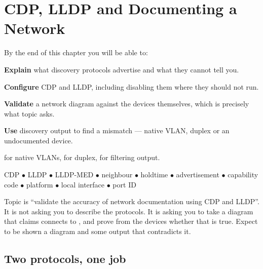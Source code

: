 \chapter{CDP, LLDP and Documenting a Network}\label{ch:discovery}

\begin{outcomes}
By the end of this chapter you will be able to:
\begin{tight}
  \item \textbf{Explain} what discovery protocols advertise and what they cannot
        tell you.
  \item \textbf{Configure} CDP and LLDP, including disabling them where they
        should not run.
  \item \textbf{Validate} a network diagram against the devices themselves, which
        is precisely what topic  asks.
  \item \textbf{Use} discovery output to find a mismatch --- native VLAN, duplex
        or an undocumented device.
\end{tight}
\end{outcomes}

\begin{prereq}
 for native VLANs,  for duplex,  for
filtering output.
\end{prereq}

\begin{keyterms}
CDP $\bullet$ LLDP $\bullet$ LLDP-MED $\bullet$ neighbour $\bullet$ holdtime
$\bullet$ advertisement $\bullet$ capability code $\bullet$ platform $\bullet$
local interface $\bullet$ port ID
\end{keyterms}

\begin{examnote}
Topic  is ``validate the accuracy of network documentation using CDP and
LLDP''. It is not asking you to describe the protocols. It is asking you to take
a diagram that claims  connects to , and prove from
the devices whether that is true. Expect to be shown a diagram and some
 output that contradicts it.
\end{examnote}

\section{Two protocols, one job}

